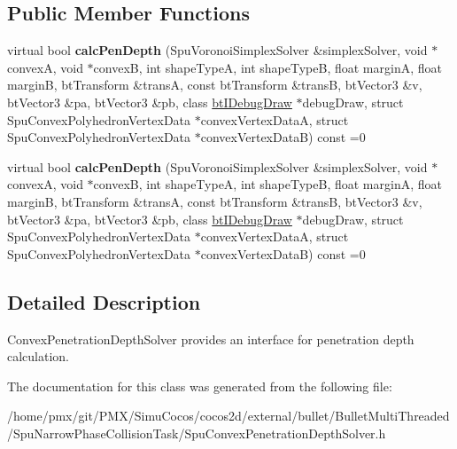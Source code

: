 \subsection*{Public Member Functions}
\begin{DoxyCompactItemize}
\item 
\mbox{\label{classSpuConvexPenetrationDepthSolver_a4be745e722674110fbd480a2b3503d6f}} 
virtual bool {\bfseries calc\+Pen\+Depth} (Spu\+Voronoi\+Simplex\+Solver \&simplex\+Solver, void $\ast$convexA, void $\ast$convexB, int shape\+TypeA, int shape\+TypeB, float marginA, float marginB, bt\+Transform \&transA, const bt\+Transform \&transB, bt\+Vector3 \&v, bt\+Vector3 \&pa, bt\+Vector3 \&pb, class \hyperlink{classbtIDebugDraw}{bt\+I\+Debug\+Draw} $\ast$debug\+Draw, struct Spu\+Convex\+Polyhedron\+Vertex\+Data $\ast$convex\+Vertex\+DataA, struct Spu\+Convex\+Polyhedron\+Vertex\+Data $\ast$convex\+Vertex\+DataB) const =0
\item 
\mbox{\label{classSpuConvexPenetrationDepthSolver_a4be745e722674110fbd480a2b3503d6f}} 
virtual bool {\bfseries calc\+Pen\+Depth} (Spu\+Voronoi\+Simplex\+Solver \&simplex\+Solver, void $\ast$convexA, void $\ast$convexB, int shape\+TypeA, int shape\+TypeB, float marginA, float marginB, bt\+Transform \&transA, const bt\+Transform \&transB, bt\+Vector3 \&v, bt\+Vector3 \&pa, bt\+Vector3 \&pb, class \hyperlink{classbtIDebugDraw}{bt\+I\+Debug\+Draw} $\ast$debug\+Draw, struct Spu\+Convex\+Polyhedron\+Vertex\+Data $\ast$convex\+Vertex\+DataA, struct Spu\+Convex\+Polyhedron\+Vertex\+Data $\ast$convex\+Vertex\+DataB) const =0
\end{DoxyCompactItemize}


\subsection{Detailed Description}
Convex\+Penetration\+Depth\+Solver provides an interface for penetration depth calculation. 

The documentation for this class was generated from the following file\+:\begin{DoxyCompactItemize}
\item 
/home/pmx/git/\+P\+M\+X/\+Simu\+Cocos/cocos2d/external/bullet/\+Bullet\+Multi\+Threaded/\+Spu\+Narrow\+Phase\+Collision\+Task/Spu\+Convex\+Penetration\+Depth\+Solver.\+h\end{DoxyCompactItemize}
